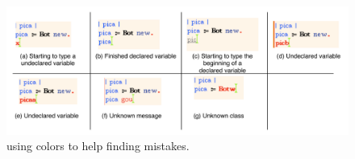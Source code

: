 \begin{figure}[h!]
\begin{center}\includegraphics[width=12cm]{coloring}
\caption{\sq using colors to help finding mistakes. \label{fig:coloring}}\end{center}
\end{figure} 




